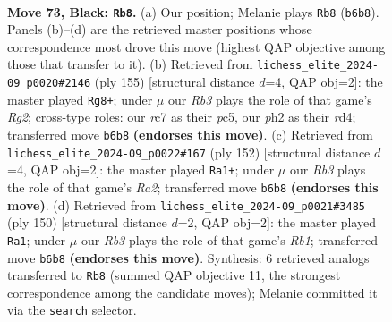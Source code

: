 \documentclass[11pt]{article}
\begin{document}
\clearpage

\begin{figure}[p]\centering
\begin{subfigure}{0.46\textwidth}\centering
\resizebox{\linewidth}{!}{%
\newchessgame
\chessboard[
  setfen={8/2R5/1r5k/8/5K2/8/7P/3r4 b - - 14 73},
  showmover=false,
  pgfstyle=straightmove, color=movearrow, markmove={b6-b8}
]}
\caption{}
\end{subfigure}\hfill
\begin{subfigure}{0.46\textwidth}\centering
\resizebox{\linewidth}{!}{%
\newchessgame
\chessboard[
  setfen={2K5/k5r1/8/2P5/3R4/8/8/8 b - - 30 78},
  showmover=false,
  pgfstyle=straightmove, color=movearrow, markmove={g7-g8}
]}
\caption{}
\end{subfigure}
\\[4pt]
\begin{subfigure}{0.46\textwidth}\centering
\resizebox{\linewidth}{!}{%
\newchessgame
\chessboard[
  setfen={8/8/8/3r4/4p3/8/R5K1/4k3 w - - 16 77},
  showmover=false,
  pgfstyle=straightmove, color=movearrow, markmove={a2-a1}
]}
\caption{}
\end{subfigure}\hfill
\begin{subfigure}{0.46\textwidth}\centering
\resizebox{\linewidth}{!}{%
\newchessgame
\chessboard[
  setfen={8/8/5p2/8/7k/3r4/8/1R2K3 w - - 8 76},
  showmover=false,
  pgfstyle=straightmove, color=movearrow, markmove={b1-a1}
]}
\caption{}
\end{subfigure}
\caption{\textbf{Move 73, Black: \texttt{Rb8}.} (a) Our position; Melanie plays \texttt{Rb8} (\texttt{b6b8}). Panels (b)--(d) are the retrieved master positions whose correspondence most drove this move (highest QAP objective among those that transfer to it). (b) Retrieved from \texttt{lichess\_elite\_2024-09\_p0020\#2146} (ply 155) [structural distance $d$=4, QAP obj=2]: the master played \texttt{Rg8+}; under $\mu$ our \emph{Rb3} plays the role of that game's \emph{Rg2}; cross-type roles: our \emph{r}c7 as their \emph{p}c5, our \emph{p}h2 as their \emph{r}d4; transferred move \texttt{b6b8} \textbf{(endorses this move)}. (c) Retrieved from \texttt{lichess\_elite\_2024-09\_p0022\#167} (ply 152) [structural distance $d$=4, QAP obj=2]: the master played \texttt{Ra1+}; under $\mu$ our \emph{Rb3} plays the role of that game's \emph{Ra2}; transferred move \texttt{b6b8} \textbf{(endorses this move)}. (d) Retrieved from \texttt{lichess\_elite\_2024-09\_p0021\#3485} (ply 150) [structural distance $d$=2, QAP obj=2]: the master played \texttt{Ra1}; under $\mu$ our \emph{Rb3} plays the role of that game's \emph{Rb1}; transferred move \texttt{b6b8} \textbf{(endorses this move)}. Synthesis: 6 retrieved analogs transferred to \texttt{Rb8} (summed QAP objective 11, the strongest correspondence among the candidate moves); Melanie committed it via the \texttt{search} selector.}
\label{fig:thought-m145}
\end{figure}
\end{document}
